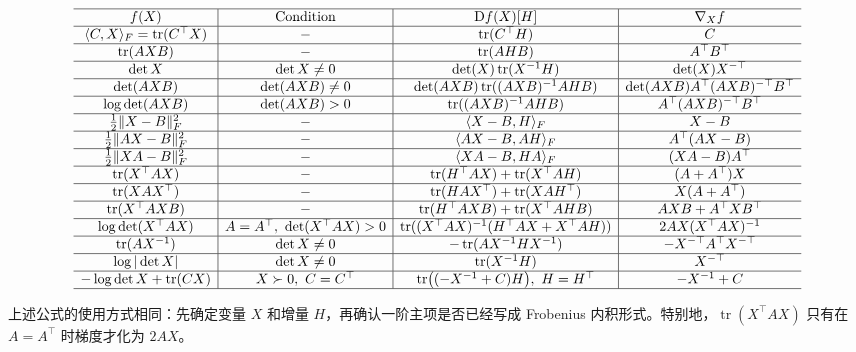 \begingroup
\scriptsize
\[
\begin{array}{c|c|c|c}
\hline
f(X) & \text{Condition} & \mathrm{D}f(X)[H] & \nabla_X f \\
\hline
\langle C,X\rangle_F=\operatorname{tr}(C^\top X)
& -
& \operatorname{tr}(C^\top H)
& C \\
\hline
\operatorname{tr}(AXB)
& -
& \operatorname{tr}(AHB)
& A^\top B^\top  \\
\hline
\det X
& \det X\ne 0
& \det(X)\operatorname{tr}(X^{-1}H)
& \det(X)X^{-\top} \\
\hline
\det(AXB)
& \det(AXB)\ne 0
& \det(AXB)\operatorname{tr}((AXB)^{-1}AHB)
& \det(AXB)A^\top(AXB)^{-\top}B^\top \\
\hline
\log\det(AXB)
& \det(AXB)>0
& \operatorname{tr}((AXB)^{-1}AHB)
& A^\top(AXB)^{-\top}B^\top \\
\hline
\frac{1}{2}\|X-B\|_F^2
& -
& \langle X-B,H\rangle_F
& X-B \\
\hline
\frac{1}{2}\|AX-B\|_F^2
& -
& \langle AX-B,AH\rangle_F
& A^\top(AX-B) \\
\hline
\frac{1}{2}\|XA-B\|_F^2
& -
& \langle XA-B,HA\rangle_F
& (XA-B)A^\top \\
\hline
\operatorname{tr}(X^\top AX)
& -
& \operatorname{tr}(H^\top AX)+\operatorname{tr}(X^\top AH)
& (A+A^\top)X \\
\hline
\operatorname{tr}(XAX^\top)
& -
& \operatorname{tr}(HAX^\top)+\operatorname{tr}(XAH^\top)
& X(A+A^\top) \\
\hline
\operatorname{tr}(X^\top AXB)
& -
& \operatorname{tr}(H^\top AXB)+\operatorname{tr}(X^\top AHB)
& AXB+A^\top XB^\top \\
\hline
\log\det(X^\top AX)
& A=A^\top,\ \det(X^\top AX)>0
& \operatorname{tr}((X^\top AX)^{-1}(H^\top AX+X^\top AH))
& 2AX(X^\top AX)^{-1} \\
\hline
\operatorname{tr}(AX^{-1})
& \det X\ne 0
& -\operatorname{tr}(AX^{-1}HX^{-1})
& -X^{-\top}A^{\top}X^{-\top} \\
\hline
\log|\det X|
& \det X\ne 0
& \operatorname{tr}(X^{-1}H)
& X^{-\top} \\
\hline
-\log\det X+\operatorname{tr}(CX)
& X\succ 0,\ C=C^\top
& \operatorname{tr}\bigl((-X^{-1}+C)H\bigr),\ H=H^\top
& -X^{-1}+C \\
\hline
\end{array}
\]
\endgroup

上述公式的使用方式相同：先确定变量 \(X\) 和增量 \(H\)，再确认一阶主项是否已经写成 Frobenius 内积形式。特别地，\(\operatorname{tr}(X^\top A X)\) 只有在 \(A=A^\top\) 时梯度才化为 \(2AX\)。

